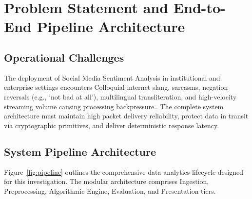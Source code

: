 \section{Problem Statement and End-to-End Pipeline Architecture}

\subsection{Operational Challenges}
The deployment of Social Media Sentiment Analysis in institutional and enterprise settings encounters Colloquial internet slang, sarcasms, negation reversals (e.g., 'not bad at all'), multilingual transliteration, and high-velocity streaming volume causing processing backpressure.. The complete system architecture must maintain high packet delivery reliability, protect data in transit via cryptographic primitives, and deliver deterministic response latency.

\subsection{System Pipeline Architecture}
Figure~\ref{fig:pipeline} outlines the comprehensive data analytics lifecycle designed for this investigation. The modular architecture comprises Ingestion, Preprocessing, Algorithmic Engine, Evaluation, and Presentation tiers.

